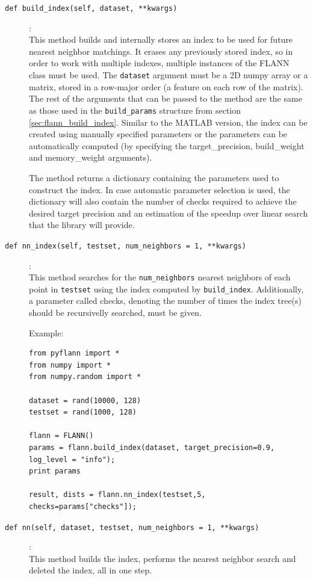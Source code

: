 \documentclass[letter,10pt]{article}
\begin{document}
\begin{description}
\item [\texttt{def build\_index(self, dataset, **kwargs)}] :\\
    This method builds and internally stores an index to be used for future
nearest neighbor matchings. It erases any previously stored index, so in order
to work with multiple indexes, multiple instances of the FLANN class must be
used. The \texttt{dataset} argument must be a 2D numpy array or a matrix, stored in a
row-major order (a feature on each row of the matrix). The
rest of the arguments that can be passed to the method are the same as
 those used in the \texttt{build\_params} structure from
section \ref{sec:flann_build_index}. Similar to the MATLAB version, the index
can be created using manually specified parameters or the parameters can be
automatically computed (by specifying the target\_precision, build\_weight and
memory\_weight arguments).

The method returns a dictionary containing the parameters used to construct the
index. In case automatic parameter selection is used, the dictionary will also
contain the number of checks required to achieve the desired target precision
and an estimation of the speedup over linear search that the library will
provide.


\item [\texttt{def nn\_index(self, testset, num\_neighbors = 1, **kwargs)}] :\\
    This method searches for the \texttt{num\_neighbors} nearest neighbors of
each point in \texttt{testset} using the index computed by
\texttt{build\_index}. Additionally, a parameter called checks, denoting the
number of times the index tree(s) should be recursivelly searched, must be
given.

Example:
\begin{Verbatim}[fontsize=\scriptsize,frame=single]
from pyflann import *
from numpy import *
from numpy.random import *

dataset = rand(10000, 128)
testset = rand(1000, 128)

flann = FLANN()
params = flann.build_index(dataset, target_precision=0.9, log_level = "info");
print params

result, dists = flann.nn_index(testset,5, checks=params["checks"]);
\end{Verbatim}

\item[\texttt{def nn(self, dataset, testset, num\_neighbors = 1, **kwargs)}]:\\
    This method builds the index, performs the nearest neighbor search and
deleted the index, all in one step.


\end{description}
\end{document}
